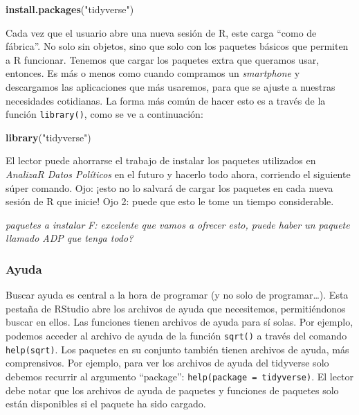 \documentclass[]{book}
\newenvironment{Shaded}{\begin{snugshade}}{\end{snugshade}}
\newcommand{\KeywordTok}[1]{\textcolor[rgb]{0.13,0.29,0.53}{\textbf{#1}}}
\newcommand{\NormalTok}[1]{#1}
\newcommand{\StringTok}[1]{\textcolor[rgb]{0.31,0.60,0.02}{#1}}
\begin{document}
\begin{Shaded}
\begin{Highlighting}[]
\KeywordTok{install.packages}\NormalTok{(}\StringTok{"tidyverse"}\NormalTok{)}
\end{Highlighting}
\end{Shaded}

Cada vez que el usuario abre una nueva sesión de R, este carga ``como de
fábrica''. No solo sin objetos, sino que solo con los paquetes básicos
que permiten a R funcionar. Tenemos que cargar los paquetes extra que
queramos usar, entonces. Es más o menos como cuando compramos un
\emph{smartphone} y descargamos las aplicaciones que más usaremos, para
que se ajuste a nuestras necesidades cotidianas. La forma más común de
hacer esto es a través de la función \texttt{library()}, como se ve a
continuación:

\begin{Shaded}
\begin{Highlighting}[]
\KeywordTok{library}\NormalTok{(}\StringTok{"tidyverse"}\NormalTok{)}
\end{Highlighting}
\end{Shaded}

El lector puede ahorrarse el trabajo de instalar los paquetes utilizados
en \emph{AnalizaR Datos Políticos} en el futuro y hacerlo todo ahora,
corriendo el siguiente súper comando. Ojo: ¡esto no lo salvará de cargar
los paquetes en cada nueva sesión de R que inicie! Ojo 2: puede que esto
le tome un tiempo considerable.

\emph{paquetes a instalar} \emph{F: excelente que vamos a ofrecer esto,
puede haber un paquete llamado ADP que tenga todo?}

\hypertarget{ayuda}{%
\subsubsection{Ayuda}\label{ayuda}}

Buscar ayuda es central a la hora de programar (y no solo de
programar\ldots{}). Esta pestaña de RStudio abre los archivos de ayuda
que necesitemos, permitiéndonos buscar en ellos. Las funciones tienen
archivos de ayuda para sí solas. Por ejemplo, podemos acceder al archivo
de ayuda de la función \texttt{sqrt()} a través del comando
\texttt{help(sqrt)}. Los paquetes en su conjunto también tienen archivos
de ayuda, más comprensivos. Por ejemplo, para ver los archivos de ayuda
del tidyverse solo debemos recurrir al argumento ``package'':
\texttt{help(package\ =\ tidyverse)}. El lector debe notar que los
archivos de ayuda de paquetes y funciones de paquetes solo están
disponibles si el paquete ha sido cargado.
\end{document}
